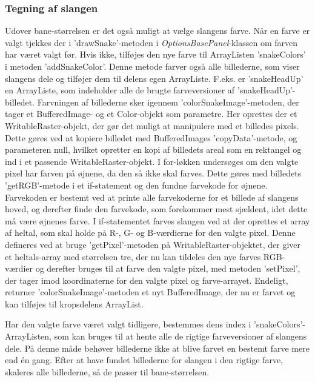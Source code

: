 \subsubsection{Tegning af slangen}
Udover bane-størrelsen er det også muligt at vælge slangens farve. Når en farve er valgt tjekkes der i 'drawSnake'-metoden i \textit{OptionsBasePanel}-klassen om farven har været valgt før. Hvis ikke, tilføjes den nye farve til ArrayListen 'snakeColors' i metoden 'addSnakeColor'. Denne metode farver også alle billederne, som viser slangens dele og tilføjer dem til delens egen ArrayListe. F.eks. er 'snakeHeadUp' en ArrayListe, som indeholder alle de brugte farveversioner af 'snakeHeadUp'-billedet. Farvningen af billederne sker igennem 'colorSnakeImage'-metoden, der tager et BufferedImage- og et Color-objekt som parametre. Her oprettes der et WritableRaster-objekt, der gør det muligt at manipulere med et billedes pixels. Dette gøres ved at kopiere billedet med BufferedImages 'copyData'-metode, og parameteren null, hvilket opretter en kopi af billedets areal som en rektangel og ind i et passende WritableRaster-objekt. I for-løkken undersøges om den valgte pixel har farven på øjnene, da den så ikke skal farves. Dette gøres med billedets 'getRGB'-metode i et if-statement og den fundne farvekode for øjnene. Farvekoden er bestemt ved at printe alle farvekoderne for et billede af slangens hoved, og derefter finde den farvekode, som forekommer mest sjældent, idet dette må være øjnenes farve. I if-statementet farves slangen ved at der oprettes et array af heltal, som skal holde på R-, G- og B-værdierne for den valgte pixel. Denne defineres ved at bruge 'getPixel'-metoden på WritableRaster-objektet, der giver et heltals-array med størrelsen tre, der nu kan tildeles den nye farves RGB-værdier og derefter bruges til at farve den valgte pixel, med metoden 'setPixel', der tager imod koordinaterne for den valgte pixel og farve-arrayet. Endeligt, returner 'colorSnakeImage'-metoden et nyt BufferedImage, der nu er farvet og kan tilføjes til kropsdelens ArrayList.
\newline

Har den valgte farve været valgt tidligere, bestemmes dens index i 'snakeColors'-ArrayListen, som kan bruges til at hente alle de rigtige farveversioner af slangens dele. På denne måde behøver billederne ikke at blive farvet en bestemt farve mere end én gang. Efter at have fundet billederne for slangen i den rigtige farve, skaleres alle billederne, så de passer til bane-størrelsen. 
\newline

